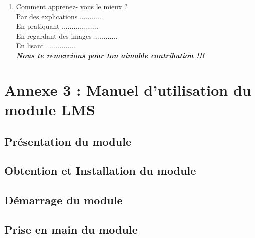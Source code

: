 \begin{enumerate}
\item Comment apprenez- vous le mieux ?\\
Par des explications ............\\
En pratiquant ...................\\
En regardant des images ............\\
En lisant ...............\\

	\emph{\textbf{Nous te remercions pour ton aimable contribution !!!}}
\end{enumerate}

\newpage
\section*{Annexe 3 : Manuel d'utilisation du module LMS}

\subsection*{Présentation du module}
\subsection*{Obtention et Installation du module}
\subsection*{Démarrage du module}
\subsection*{Prise en main du module} 